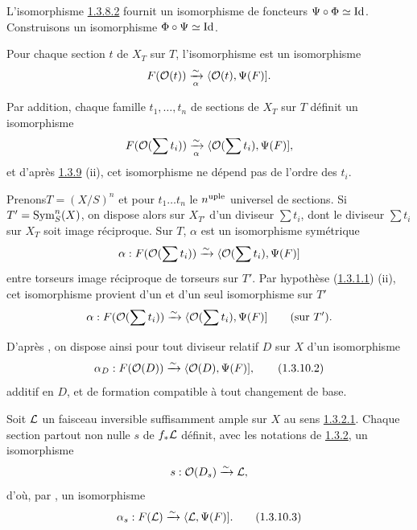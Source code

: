 \documentclass[10pt]{../fichiers-configuration-latex/smfart}
\begin{document}
L'isomorphisme \hyperref[XVIII.par1.3.8.2]{1.3.8.2} fournit un isomorphisme de foncteurs
$\Psi\circ\Phi \simeq \operatorname{Id}$. Construisons un isomorphisme
$\Phi\circ\Psi\simeq \operatorname{Id}$.

Pour chaque section $t$ de $X_{T}$ sur $T$, l'isomorphisme 
est un isomorphisme
$$
F({\mathcal O}(t))\xrightarrow[\alpha]{\sim}\langle {\mathcal O}(t),\Psi(F)]{}.
$$

Par addition, chaque famille $t_{1},\ldots, t_{n}$ de sections de
$X_{T}$ sur $T$ définit un isomorphisme
$$
F({\mathcal O}(\sum t_{i}))\xrightarrow[\alpha]{\sim}\langle {\mathcal O}(\sum
t_{i}),\Psi(F)]{},
$$
et d'après \hyperref[XVIII.subsubsec1.3.9]{1.3.9} (ii), cet isomorphisme ne dépend
pas de l'ordre des $t_{i}$.

Prenons\pageoriginale $T=(X/S)^{n}$ et pour $t_{1}\ldots t_{n}$ le
$n^{\text{\rm uple}}$ universel de sections. Si $T'=\operatorname{Sym}^{n}_{S}(X)$,
on dispose alors sur $X_{T'}$ d'un diviseur $\sum t_{i}$, dont le
diviseur $\sum t_{i}$ sur $X_{T}$ soit image réciproque. Sur $T$,
$\alpha$ est un isomorphisme symétrique
$$
\alpha:F({\mathcal O}(\sum t_{i}))\xrightarrow{\sim} \langle {\mathcal O}(\sum
t_{i}),\Psi(F)]
$$
entre torseurs image réciproque de torseurs sur $T'$. Par hypothèse
(\hyperref[XVIII.par1.3.1.1]{1.3.1.1}) (ii), cet isomorphisme provient d'un et d'un seul
isomorphisme sur $T'$
$$
\alpha:F({\mathcal O}(\sum t_{i}))\xrightarrow{\sim} \langle {\mathcal O} (\sum
t_{i}),\Psi (F)]\qquad (\text{\rm sur  } T'){}.
$$

D'après , on dispose ainsi pour tout diviseur relatif $D$ sur
$X$ d'un isomorphisme
\begin{equation*}
\alpha_{D}:F({\mathcal O}(D))\xrightarrow{\sim}
\langle {\mathcal O}(D),\Psi(F)]{},\tag{1.3.10.2}
\end{equation*}%
additif en $D$, et de formation compatible à tout changement de base.

Soit ${\mathcal L}$ un faisceau inversible suffisamment ample sur $X$
au sens \hyperref[XVIII.par1.3.2.1]{1.3.2.1}. Chaque section partout non nulle $s$ de
$f_{\ast}{\mathcal L}$ définit, avec les notations de \hyperref[XVIII.subsubsec1.3.2]{1.3.2}, un
isomorphisme
$$
s:{\mathcal O}(D_{s})\xrightarrow{\sim}{\mathcal L}{},
$$
d'où, par , un isomorphisme
\begin{equation*}
\alpha_{s}:F({\mathcal L})\xrightarrow{\sim}\langle {\mathcal L},\Psi(F)]{}.\tag{1.3.10.3}
\end{equation*}
\end{document}
